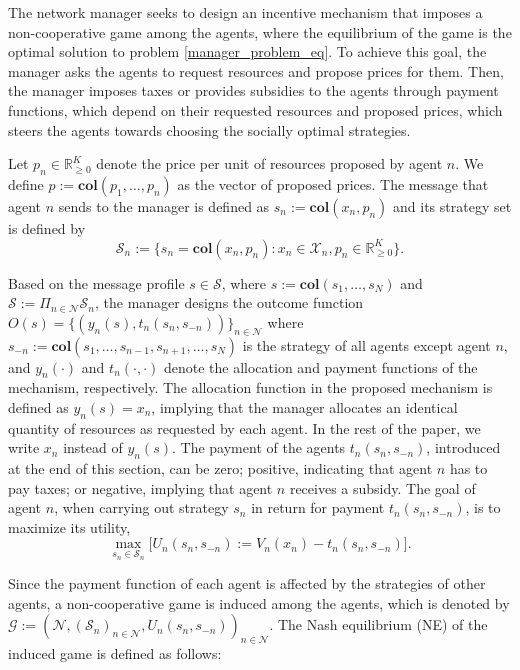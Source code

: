 \documentclass[twocolumn]{autart}
\begin{document}
\par
The network manager seeks to design an incentive mechanism that imposes a non-cooperative game among the agents, where the equilibrium of the game is the optimal solution to problem \eqref{manager_problem_eq}. To achieve this goal, the manager asks the agents to request resources and propose prices for them. Then, the manager imposes taxes or provides subsidies to the agents through payment functions, which depend on their requested resources and proposed prices, which steers the agents towards choosing the socially optimal strategies.
\par
Let $p_n\in\mathbb{R}_{\geq 0}^{K}$ denote the price per unit of resources proposed by agent $n$. We define $p:=\textbf{col}(p_1,\ldots, p_n)$ as the vector of proposed prices. The message that agent $n$ sends to the manager is defined as $s_n:=\textbf{col}(x_n, p_n)$ and its strategy set is defined by
\[\mathcal{S}_n:=\{s_n=\textbf{col}(x_n, p_n):x_n\in\mathcal{X}_n, p_n\in\mathbb{R}_{\geq 0}^{K}\}.\] 
\par
Based on the message profile $s\in\mathcal{S}$, where $s:=\textbf{col}(s_1,\dots,s_N)$ and $\mathcal{S}:=\Pi_{n\in\mathcal{N}}\mathcal{S}_n$, the manager designs the outcome function $O(s)=\{(y_n(s), t_n(s_n,s_{-n}))\}_{n\in\mathcal{N}}$ where $s_{-n}:=\textbf{col}(s_1, \dots, s_{n-1},s_{n+1}, \ldots, s_N)$ is the strategy of all agents except agent $n$, and $y_n(\cdot)$ and $t_n(\cdot,\cdot)$ denote the allocation and payment functions of the mechanism, respectively. The allocation function in the proposed mechanism is defined as $y_n(s) = x_n$, implying that the manager allocates an identical quantity of resources as requested by each agent. In the rest of the paper, we write $x_n$ instead of $y_n(s)$. The payment of the agents $t_n(s_n, s_{-n})$, introduced at the end of this section, can be zero; positive, indicating that agent $n$ has to pay taxes; or negative, implying that agent $n$ receives a subsidy. The goal of agent $n$, when carrying out strategy $s_n$ in return for payment $t_n(s_n,s_{-n})$, is to maximize its utility,
\begin{equation}\label{utility_maximization_eq}
	\max_{s_n\in\mathcal{S}_n}{[U_n(s_n, s_{-n}):=}V_n(x_n)-t_n(s_n, s_{-n})].
\end{equation}
\par
Since the payment function of each agent is affected by the strategies of other agents, a non-cooperative game is induced among the agents, which is denoted by $\mathcal{G}:=(\mathcal{N}, (\mathcal{S}_n)_{n\in\mathcal{N}}, U_n(s_n, s_{-n}))_{n\in\mathcal{N}}$. 
The Nash equilibrium (NE) of the induced game is defined as follows:
\end{document}
